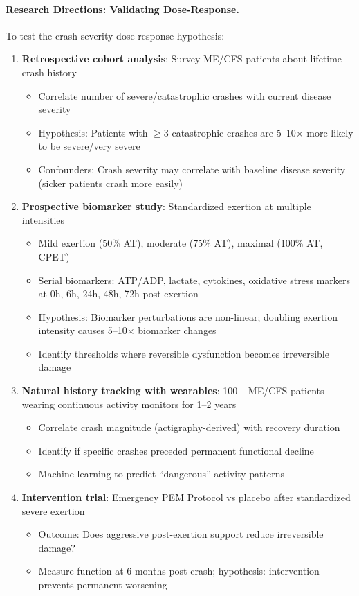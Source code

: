 \paragraph{Research Directions: Validating Dose-Response.}

To test the crash severity dose-response hypothesis:

\begin{enumerate}
    \item \textbf{Retrospective cohort analysis}: Survey ME/CFS patients about lifetime crash history
    \begin{itemize}
        \item Correlate number of severe/catastrophic crashes with current disease severity
        \item Hypothesis: Patients with $\geq$3 catastrophic crashes are 5--10$\times$ more likely to be severe/very severe
        \item Confounders: Crash severity may correlate with baseline disease severity (sicker patients crash more easily)
    \end{itemize}

    \item \textbf{Prospective biomarker study}: Standardized exertion at multiple intensities
    \begin{itemize}
        \item Mild exertion (50\% AT), moderate (75\% AT), maximal (100\% AT, CPET)
        \item Serial biomarkers: ATP/ADP, lactate, cytokines, oxidative stress markers at 0h, 6h, 24h, 48h, 72h post-exertion
        \item Hypothesis: Biomarker perturbations are non-linear; doubling exertion intensity causes 5--10$\times$ biomarker changes
        \item Identify thresholds where reversible dysfunction becomes irreversible damage
    \end{itemize}

    \item \textbf{Natural history tracking with wearables}: 100+ ME/CFS patients wearing continuous activity monitors for 1--2 years
    \begin{itemize}
        \item Correlate crash magnitude (actigraphy-derived) with recovery duration
        \item Identify if specific crashes preceded permanent functional decline
        \item Machine learning to predict ``dangerous'' activity patterns
    \end{itemize}

    \item \textbf{Intervention trial}: Emergency PEM Protocol vs placebo after standardized severe exertion
    \begin{itemize}
        \item Outcome: Does aggressive post-exertion support reduce irreversible damage?
        \item Measure function at 6 months post-crash; hypothesis: intervention prevents permanent worsening
    \end{itemize}
\end{enumerate}

